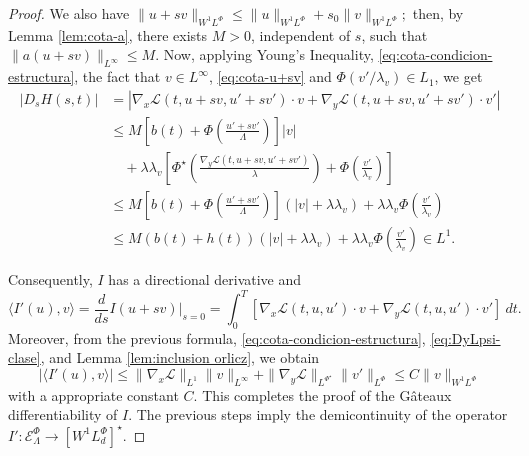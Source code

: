 \documentclass[twoside]{article}
\theoremstyle{remark}
\newcommand{\orlnor}{\|_{L^{\Phi}}}
\newcommand{\linf}{\|_{L^{\infty}}}
\newcommand{\lphi}{L^{\Phi}}
\newcommand{\lpsi}{L^{\Phi^{\star}}}
\newcommand{\wphi}{W^{1}\lphi}
\newcommand{\sobnor}{\|_{W^{1}\lphi}}
\newcommand{\domi}{\mathcal{E}^{\Phi}}
\renewcommand{\leq}{\leqslant}
\begin{document}
\begin{proof}
We also have
$
\|u+sv\sobnor\leq \|u\sobnor+s_0\|v\sobnor;
$
then, by Lemma \ref{lem:cota-a}, there exists $M>0$, independent of $s$, such that
$\|a(u+sv)\linf\leq M$. Now, applying Young's Inequality,  \eqref{eq:cota-condicion-estructura},
the fact that $v \in L^{\infty}$, \eqref{eq:cota-u+sv} and $\Phi(v'/\lambda_v)\in L_1$, 
we get
\begin{equation}\label{ctg}
\begin{split}
|D_s H(s,t)|&=\left| \nabla_x\mathcal{L}(t,u+sv,u'+sv')\cdot v +
  \nabla_y\mathcal{L}(t, u+s v, u'+sv')\cdot v'\right| \\
  & \leq M \left[ b(t)+ \Phi\left(\frac{u'+sv'}{\Lambda}\right)\right]|v|\\
 &\quad+ \lambda\lambda_v\left[\Phi^{\star}\left(\frac{\nabla_y\mathcal{L}(t,u+sv,u'+sv')}{\lambda}\right)+\Phi\left(\frac{v'}{\lambda_v}\right) \right]
\\
 &\leq 
 M \left[ b(t)+ \Phi\left(\frac{u'+sv'}{\Lambda}\right)\right] \left(|v|+\lambda\lambda_v\right) +\lambda\lambda_v \Phi\left(\frac{v'}{\lambda_v}\right)\\
  &\leq 
 M \left( b(t)+h(t)\right) \left(|v|+\lambda\lambda_v\right)+\lambda\lambda_v \Phi\left(\frac{v'}{\lambda_v}\right)
 \in L^1.
\end{split}
\end{equation}

Consequently, $I$ has a directional derivative and
\[
\langle I'(u),v \rangle=\frac{d}{ds}I(u+s v)\big|_{s=0}=\int_0^T  
\left[\nabla_x\mathcal{L}(t,u,u')\cdot v+ \nabla_y\mathcal{L}(t,u,u')\cdot v'\right] \ dt.
\]
Moreover, from the previous formula, \eqref{eq:cota-condicion-estructura},  \eqref{eq:DyLpsi-clase}, and
Lemma \ref{lem:inclusion orlicz}, we obtain
\[
|\langle I'(u),v \rangle| \leq \|\nabla_x\mathcal{L}\|_{L^1} \| v\linf + 
\|\nabla_y\mathcal{L}\|_{\lpsi} \|v'\orlnor \leq C \|v\sobnor
\]
with a appropriate constant $C$.
This completes the proof of the G\^ateaux differentiability of $I$. 
The previous steps imply the demicontinuity of the operator $I':\domi_{\Lambda}  \to \left[\wphi_d
\right]^{\star} $.



\end{proof}
\end{document}

